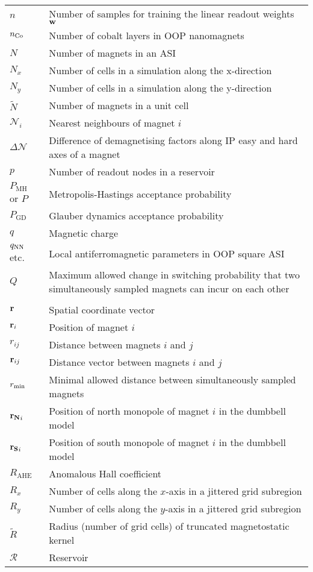 \begin{longtable}[l]{p{50pt} p{295pt}}
	$n$ & Number of samples for training the linear readout weights $\boldsymbol{\mathbf{w}}$ \\
	$n_{\ce{Co}}$ & Number of cobalt layers in OOP nanomagnets \\
	$N$ & Number of magnets in an ASI \\
	$N_x$ & Number of cells in a simulation along the x-direction \\
	$N_y$ & Number of cells in a simulation along the y-direction \\
	$\widetilde{N}$ & Number of magnets in a unit cell \\
	$\mathcal{N}_i$ & Nearest neighbours of magnet $i$ \\
	$\Delta \mathcal{N}$ & Difference of demagnetising factors along IP easy and hard axes of a magnet\vspace{\whiteline}\\

	$p$ & Number of readout nodes in a reservoir \\
	$P_\mathrm{MH}$ or $P$ & Metropolis-Hastings acceptance probability \\
	$P_\mathrm{GD}$ & Glauber dynamics acceptance probability\vspace{\whiteline}\\

	$q$ & Magnetic charge \\
	$q_\mathrm{NN}$ etc. & Local antiferromagnetic parameters in OOP square ASI \\
	$Q$ & Maximum allowed change in switching probability that two simultaneously sampled magnets can incur on each other \\ &\vspace{\whiteline}\\

	$\boldsymbol{\mathbf{r}}$ & Spatial coordinate vector \\
	$\boldsymbol{\mathbf{r}}_i$ & Position of magnet $i$ \\
	$r_{ij}$ & Distance between magnets $i$ and $j$ \\
	$\boldsymbol{\mathbf{r}}_{ij}$ & Distance vector between magnets $i$ and $j$ \\
	$r_\mathrm{min}$ & Minimal allowed distance between simultaneously sampled magnets \\
	$\boldsymbol{\mathbf{r_N}}_i$ & Position of north monopole of magnet $i$ in the dumbbell model \\
	$\boldsymbol{\mathbf{r_S}}_i$ & Position of south monopole of magnet $i$ in the dumbbell model \\
	$R_\mathrm{AHE}$ & Anomalous Hall coefficient \\
	$R_x$ & Number of cells along the $x$-axis in a jittered grid subregion \\
	$R_y$ & Number of cells along the $y$-axis in a jittered grid subregion \\
	$\widetilde{R}$ & Radius (number of grid cells) of truncated magnetostatic kernel \\
	$\mathcal{R}$ & Reservoir\vspace{\whiteline}\\


\end{longtable}
